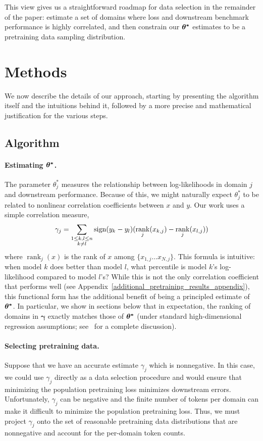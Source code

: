 \documentclass{article} %
\DeclareMathOperator{\rank}{rank}
\begin{document}
This view gives us a straightforward roadmap for data selection in the remainder of the paper: estimate a set of domains where loss and downstream benchmark performance is highly correlated, and then constrain our $\bm{{\bf{\theta}^*}}$  estimates to be a pretraining data sampling distribution.

\section{Methods}
We now describe the details of our approach, starting by presenting the algorithm itself and the intuitions behind it, followed by a more precise and mathematical justification for the various steps. 

\subsection{Algorithm}
\label{algorithm}

\paragraph*{Estimating $\bm{{\bf{\theta}^*}}$.} 
The parameter $\theta^*_j$ measures the relationship between log-likelihoods in domain $j$ and downstream performance. Because of this, we might naturally expect $\theta^*_j$ to be related to  nonlinear correlation coefficients between $x$ and $y$. Our work uses a simple correlation measure,
\[
\gamma_j = \sum_{\substack{1 \leq k,l \leq n\\k \neq l}}\sign(y_k-y_l)(\rank_j(x_{k,j}) - \rank_j(x_{l,j}))
\]
where $\rank_j(x)$ is the rank of $x$ among $\{x_{1,j} \hdots x_{N,j}\}$. This formula is intuitive: when model $k$ does better than model $l$, what percentile is model $k$'s log-likelihood compared to model $l$'s? While this is not the only correlation coefficient that performs well (see Appendix~\ref{additional_pretraining_results_appendix}), this functional form has the additional benefit of being a principled estimate of $\bm{{\bf{\theta}^*}}$. In particular, we show in sections below that in expectation, the ranking of domains in $\bm{\gamma}$ exactly matches those of $\bm{{\bf{\theta}^*}}$ (under standard high-dimensional regression assumptions; see~ for a complete discussion).

\paragraph*{Selecting pretraining data.} Suppose that we have an accurate estimate $\gamma_j$ which is nonnegative. In this case, we could use $\gamma_j$ directly as a data selection procedure and  would ensure that minimizing the population pretraining loss minimizes downstream errors. Unfortunately, $\gamma_j$ can be negative and the finite number of tokens per domain can make it difficult to minimize the population pretraining loss. Thus, we must project $\gamma_j$ onto the set of reasonable pretraining data distributions that are nonnegative and account for the per-domain token counts.
\end{document}
